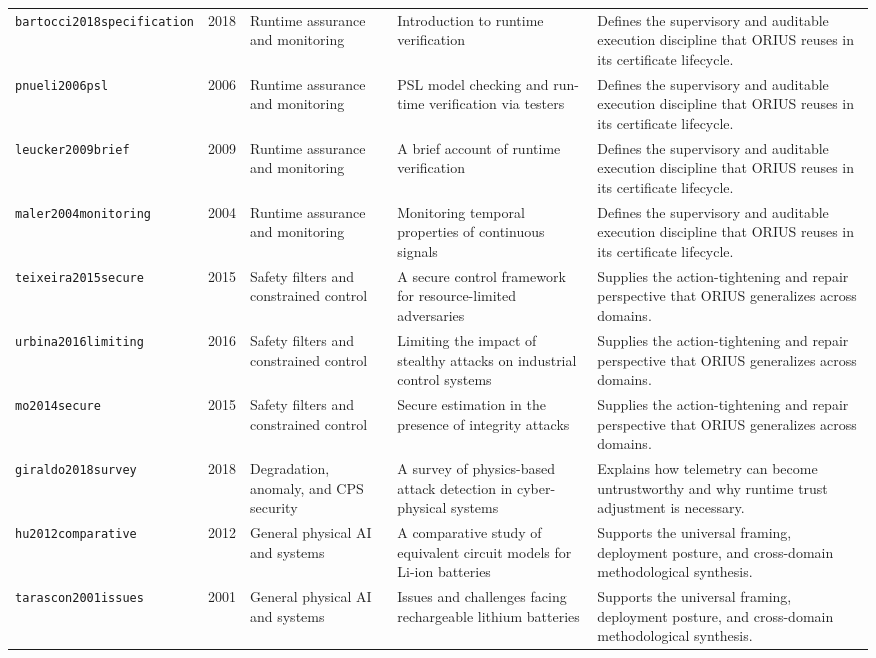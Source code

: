 \begin{longtable}{p{}p{}p{}p{}p{}}
\texttt{bartocci2018specification} & 2018 & Runtime assurance and monitoring & Introduction to runtime verification & Defines the supervisory and auditable execution discipline that ORIUS reuses in its certificate lifecycle.\\
\texttt{pnueli2006psl} & 2006 & Runtime assurance and monitoring & PSL model checking and run-time verification via testers & Defines the supervisory and auditable execution discipline that ORIUS reuses in its certificate lifecycle.\\
\texttt{leucker2009brief} & 2009 & Runtime assurance and monitoring & A brief account of runtime verification & Defines the supervisory and auditable execution discipline that ORIUS reuses in its certificate lifecycle.\\
\texttt{maler2004monitoring} & 2004 & Runtime assurance and monitoring & Monitoring temporal properties of continuous signals & Defines the supervisory and auditable execution discipline that ORIUS reuses in its certificate lifecycle.\\
\texttt{teixeira2015secure} & 2015 & Safety filters and constrained control & A secure control framework for resource-limited adversaries & Supplies the action-tightening and repair perspective that ORIUS generalizes across domains.\\
\texttt{urbina2016limiting} & 2016 & Safety filters and constrained control & Limiting the impact of stealthy attacks on industrial control systems & Supplies the action-tightening and repair perspective that ORIUS generalizes across domains.\\
\texttt{mo2014secure} & 2015 & Safety filters and constrained control & Secure estimation in the presence of integrity attacks & Supplies the action-tightening and repair perspective that ORIUS generalizes across domains.\\
\texttt{giraldo2018survey} & 2018 & Degradation, anomaly, and CPS security & A survey of physics-based attack detection in cyber-physical systems & Explains how telemetry can become untrustworthy and why runtime trust adjustment is necessary.\\
\texttt{hu2012comparative} & 2012 & General physical AI and systems & A comparative study of equivalent circuit models for Li-ion batteries & Supports the universal framing, deployment posture, and cross-domain methodological synthesis.\\
\texttt{tarascon2001issues} & 2001 & General physical AI and systems & Issues and challenges facing rechargeable lithium batteries & Supports the universal framing, deployment posture, and cross-domain methodological synthesis.\\

\end{longtable}
